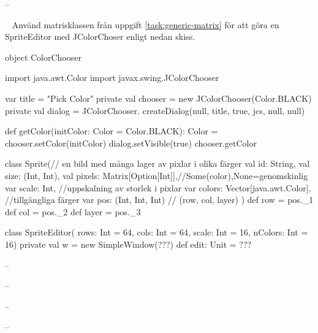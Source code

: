 \SOLUTION


\TaskSolved \what

\SubtaskSolved  -- %



\QUESTEND







\QUESTBEGIN

\Task  \what~ Använd matrisklassen från uppgift \ref{task:generic-matrix} för att göra en SpriteEditor med JColorChoser enligt nedan skiss.

\begin{Code}
object ColorChooser {
  import java.awt.Color
  import javax.swing.JColorChooser

  var title = "Pick Color"
  private val chooser = new JColorChooser(Color.BLACK)
  private val dialog = JColorChooser.
    createDialog(null, title, true, jcs, null, null)

  def getColor(initColor: Color = Color.BLACK): Color = {
    chooser.setColor(initColor)
    dialog.setVisible(true)
    chooser.getColor
  }
}

class Sprite(// en bild med många lager av pixlar i olika färger
  val id: String,
  val size: (Int, Int),
  val pixels: Matrix[Option[Int]],//Some(color),None=genomskinlig
  var scale: Int, //uppskalning av storlek i pixlar
  var colors: Vector[java.awt.Color], //tillgängliga färger
  var pos: (Int, Int, Int)  // (row, col, layer)
){
  def row = pos._1
  def col = pos._2
  def layer = pos._3
}

class SpriteEditor(
    rows: Int = 64, cols: Int = 64,
    scale: Int = 16, nColors: Int = 16) {
  private val w = new SimpleWindow(???)
  def edit: Unit = ???
}

\end{Code}



\SOLUTION


\TaskSolved \what

\SubtaskSolved  -- %

\SubtaskSolved  -- %

\SubtaskSolved  -- %

\SubtaskSolved  -- %

